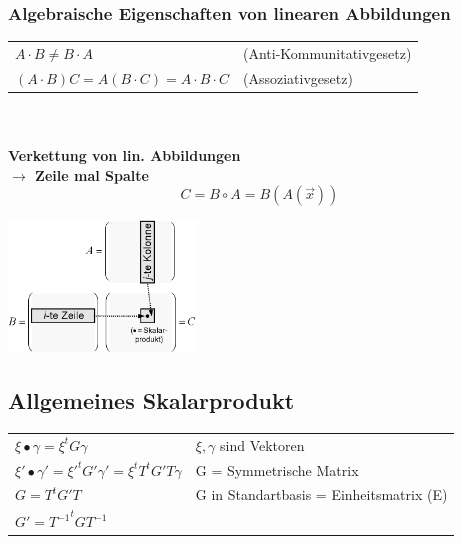 	\subsubsection{Algebraische Eigenschaften von linearen Abbildungen}
		\begin{minipage}{10cm}
			\begin{tabular}{ll}
				$A \cdot B \neq B \cdot A$ & (Anti-Kommunitativgesetz)\\
				$(A \cdot B)C = A(B \cdot C) = A \cdot B \cdot C$ & (Assoziativgesetz)
			\end{tabular}\\ \\
			\textbf{Verkettung von lin. Abbildungen}\\
			\textbf{$\rightarrow$ Zeile mal Spalte}\\
				$$C=B\circ A=B(A(\vec{x}))$$
		\end{minipage}
		\begin{minipage}{7cm}
			\includegraphics[width=5cm]{pics/3_Matrizenmulti}
		\end{minipage}

\subsection{Allgemeines Skalarprodukt}
	\begin{tabular}{ll}
		$\xi \bullet  \gamma = \xi^tG\gamma$ & $\xi, \gamma$ sind Vektoren\\
		$\xi' \bullet \gamma' = {\xi'}^tG'\gamma' = \xi^tT^tG'T\gamma$ & G = Symmetrische Matrix\\
		$G = T^tG'T$ & G in Standartbasis = Einheitsmatrix (E)\\
		$G' = {T^{-1}}^tGT^{-1}$ &
	\end{tabular}






















